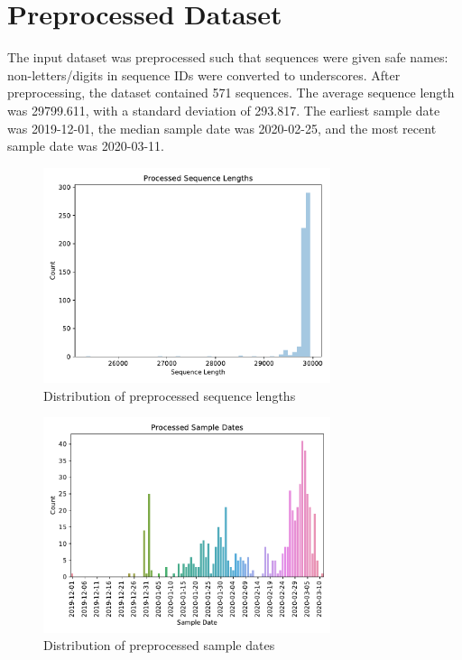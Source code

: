 \documentclass{article}
\begin{document}
\section{Preprocessed Dataset}
The input dataset was preprocessed such that sequences were given safe names: non-letters/digits in sequence IDs were converted to underscores.
After preprocessing, the dataset contained 571 sequences.
The average sequence length was 29799.611,
with a standard deviation of 293.817.
The earliest sample date was 2019-12-01,
the median sample date was 2020-02-25,
and the most recent sample date was 2020-03-11.


\begin{figure}[h]
\centering
\includegraphics[width=0.75\textwidth,keepaspectratio]{./figs/processed_sequence_lengths.pdf}
\caption{Distribution of preprocessed sequence lengths}
\end{figure}



\begin{figure}[h]
\centering
\includegraphics[width=0.75\textwidth,keepaspectratio]{./figs/processed_sample_dates.pdf}
\caption{Distribution of preprocessed sample dates}
\end{figure}
\end{document}
